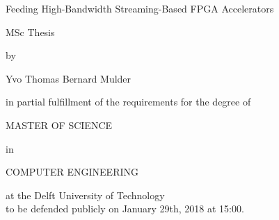 \begin{titlingpage}

\begin{center}





\vspace*{2\bigskipamount}

{\makeatletter
\color{black}\Huge Feeding High-Bandwidth Streaming-Based FPGA Accelerators
\makeatother}

{\makeatletter
\ifx\@subtitle\undefined\else
    \bigskip
    \titleshape\LARGE MSc Thesis
\fi
\makeatother}

\bigskip
\bigskip

by

\bigskip
\bigskip

{\makeatletter
\Large Yvo Thomas Bernard Mulder
\makeatother}

\vfill

in partial fulfillment of the requirements for the degree of

\bigskip
\bigskip

MASTER OF SCIENCE

\bigskip

in

\bigskip

\textsc{COMPUTER ENGINEERING}

\bigskip
\bigskip

at the Delft University of Technology\\

to be defended publicly on January 29th, 2018 at 15:00.


\end{center}
\end{titlingpage}
